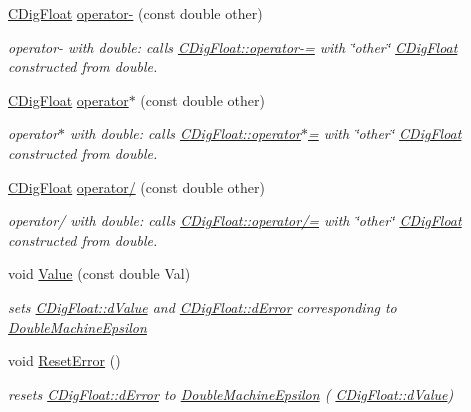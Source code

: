 \begin{DoxyCompactItemize}
\hyperlink{classCDigFloat}{C\+Dig\+Float} \hyperlink{classCDigFloat_ad873c5c22f0f18e89caf7309a043bfa0}{operator-\/} (const double other)
\begin{DoxyCompactList}\small\item\em operator-\/ with double\+: calls \hyperlink{classCDigFloat_a7496a4f8445815e9a346076c3d90305a}{C\+Dig\+Float\+::operator-\/=} with \char`\"{}other\char`\"{} \hyperlink{classCDigFloat}{C\+Dig\+Float} constructed from double. \end{DoxyCompactList}\item 
\hyperlink{classCDigFloat}{C\+Dig\+Float} \hyperlink{classCDigFloat_aa699c4362ad8acfcd1649f93d805e105}{operator$\ast$} (const double other)
\begin{DoxyCompactList}\small\item\em operator$\ast$ with double\+: calls \hyperlink{classCDigFloat_a9535d47a31a3f1cfa487cc8c567a4a12}{C\+Dig\+Float\+::operator$\ast$=} with \char`\"{}other\char`\"{} \hyperlink{classCDigFloat}{C\+Dig\+Float} constructed from double. \end{DoxyCompactList}\item 
\hyperlink{classCDigFloat}{C\+Dig\+Float} \hyperlink{classCDigFloat_a4e9cc3b14f2b5a6d704957fb1a8de1a2}{operator/} (const double other)
\begin{DoxyCompactList}\small\item\em operator/ with double\+: calls \hyperlink{classCDigFloat_a53d3939dfc89d172f1bf803a46bc3369}{C\+Dig\+Float\+::operator/=} with \char`\"{}other\char`\"{} \hyperlink{classCDigFloat}{C\+Dig\+Float} constructed from double. \end{DoxyCompactList}\item 
void \hyperlink{classCDigFloat_af74b8cd0935294b6371f551b7a1ff640}{Value} (const double Val)
\begin{DoxyCompactList}\small\item\em sets \hyperlink{classCDigFloat_a4bbe69e30dd4e20527362493aa9aaf96}{C\+Dig\+Float\+::d\+Value} and \hyperlink{classCDigFloat_a25eb3782d1e727ff007a48f8308e3d4d}{C\+Dig\+Float\+::d\+Error} corresponding to \hyperlink{Utils_8h_ae9dfc174daaf6261f167ccc069efea93}{Double\+Machine\+Epsilon} \end{DoxyCompactList}\item 
void \hyperlink{classCDigFloat_a47dd744a2100dc850ede1511e616ed39}{Reset\+Error} ()
\begin{DoxyCompactList}\small\item\em resets \hyperlink{classCDigFloat_a25eb3782d1e727ff007a48f8308e3d4d}{C\+Dig\+Float\+::d\+Error} to \hyperlink{Utils_8h_ae9dfc174daaf6261f167ccc069efea93}{Double\+Machine\+Epsilon} ( \hyperlink{classCDigFloat_a4bbe69e30dd4e20527362493aa9aaf96}{C\+Dig\+Float\+::d\+Value}) \end{DoxyCompactList}\item 

\end{DoxyCompactItemize}
